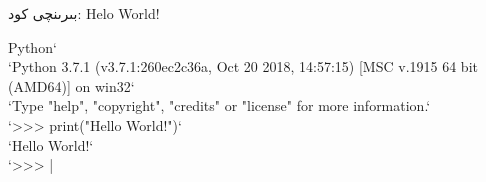 بىرىنچى كود: \textenglish{Helo World!} \\
\begin{english}

\begin{windows}
Python`\\`Python 3.7.1 (v3.7.1:260ec2c36a, Oct 20 2018, 14:57:15) [MSC v.1915 64 bit (AMD64)] on win32`\\`Type "help", "copyright", "credits" or "license" for more information.`\\`>>> print("Hello World!")`\\`Hello World!`\\`>>> |
\end{windows}
\end{english}











